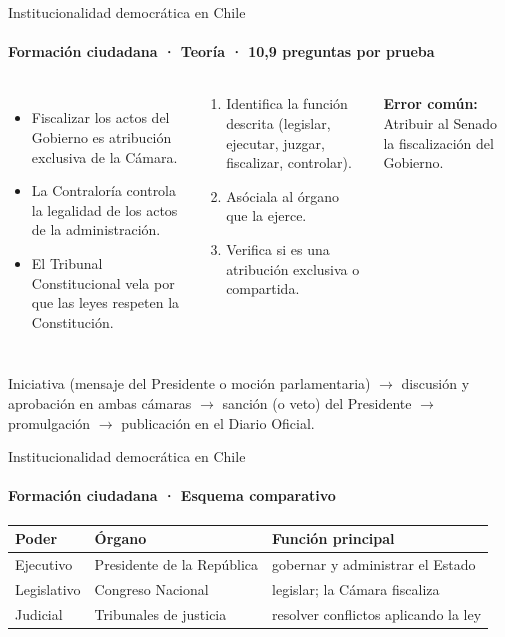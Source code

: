 \documentclass[aspectratio=169,11pt]{beamer}
\newlength{\ajustealto}
\newenvironment{ajustar}[1][0.74\textheight]
  {\setlength{\ajustealto}{#1}\begin{lrbox}{\ajustecaja}\begin{minipage}{\textwidth}}
  {\end{minipage}\end{lrbox}%
   \ifdim\dimexpr\ht\ajustecaja+\dp\ajustecaja\relax>\ajustealto
     \resizebox*{!}{\ajustealto}{\usebox{\ajustecaja}}\else\usebox{\ajustecaja}\fi}
\begin{document}
\begin{frame}{Institucionalidad democrática en Chile}
\label{tema-hi-estado}
\framesubtitle{Formación ciudadana · Teoría · 10,9 preguntas por prueba}
\begin{ajustar}
\begin{columns}[T,onlytextwidth]
\begin{itemize}\footnotesize
\item Fiscalizar los actos del Gobierno es atribución exclusiva de la Cámara.
\item La Contraloría controla la legalidad de los actos de la administración.
\item El Tribunal Constitucional vela por que las leyes respeten la Constitución.
\end{itemize}
\begin{cajaregla}\scriptsize \begin{enumerate}\item Identifica la función descrita (legislar, ejecutar, juzgar, fiscalizar, controlar).\item Asóciala al órgano que la ejerce.\item Verifica si es una atribución exclusiva o compartida.\end{enumerate}\end{cajaregla}
\begin{notagris}\scriptsize \textbf{Error común:} Atribuir al Senado la fiscalización del Gobierno.\end{notagris}
\end{columns}
\begin{cajaclave}\footnotesize
Iniciativa (mensaje del Presidente o moción parlamentaria) $\rightarrow$ discusión y aprobación en ambas cámaras $\rightarrow$ sanción (o veto) del Presidente $\rightarrow$ promulgación $\rightarrow$ publicación en el Diario Oficial.
\end{cajaclave}
\end{ajustar}
\end{frame}

\begin{frame}{Institucionalidad democrática en Chile}
\framesubtitle{Formación ciudadana · Esquema comparativo}
\begin{center}\footnotesize
\begin{tabular}{@{}>{\raggedright\arraybackslash}p{\dimexpr(\linewidth-4\tabcolsep)/3\relax}>{\raggedright\arraybackslash}p{\dimexpr(\linewidth-4\tabcolsep)/3\relax}>{\raggedright\arraybackslash}p{\dimexpr(\linewidth-4\tabcolsep)/3\relax}@{}}
\toprule
\textbf{Poder} & \textbf{Órgano} & \textbf{Función principal} \\
\midrule
Ejecutivo & Presidente de la República & gobernar y administrar el Estado \\
Legislativo & Congreso Nacional & legislar; la Cámara fiscaliza \\
Judicial & Tribunales de justicia & resolver conflictos aplicando la ley \\
\bottomrule
\end{tabular}
\end{center}
\end{frame}
\end{document}
